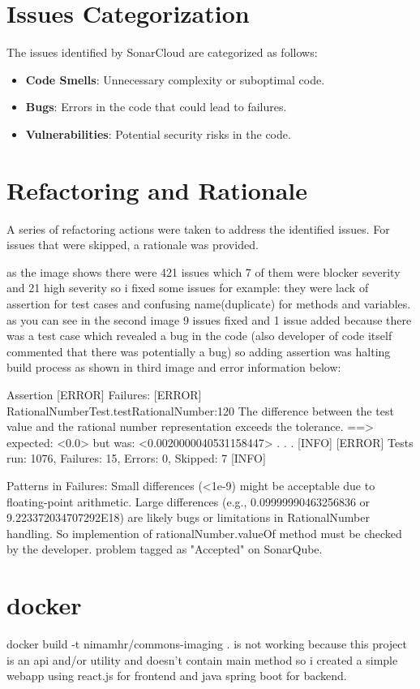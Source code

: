 \documentclass[a4paper,12pt]{report}
\begin{document}
\section{Issues Categorization}
The issues identified by SonarCloud are categorized as follows:
\begin{itemize}
    \item \textbf{Code Smells}: Unnecessary complexity or suboptimal code.
    \item \textbf{Bugs}: Errors in the code that could lead to failures.
    \item \textbf{Vulnerabilities}: Potential security risks in the code.
\end{itemize}

\section{Refactoring and Rationale}
A series of refactoring actions were taken to address the identified issues. For issues that were skipped, a rationale was provided. 

as the image shows there were 421 issues which 7 of them were blocker severity and 21 high severity so i fixed some issues for example:
they were lack of assertion for test cases and confusing name(duplicate) for methods and variables.
as you can see in the second image 9 issues fixed and 1 issue added because there was a test case which revealed a bug in the code (also developer of code itself commented that there was potentially a bug) so adding assertion was halting build process as shown in third image and error information below:


Assertion
[ERROR] Failures: 
[ERROR]   RationalNumberTest.testRationalNumber:120 The difference between the test value and the rational number representation exceeds the tolerance. ==> expected: <0.0> but was: <0.0020000040531158447>
.
.
.
[INFO] 
[ERROR] Tests run: 1076, Failures: 15, Errors: 0, Skipped: 7
[INFO] 

Patterns in Failures:
Small differences (<1e-9) might be acceptable due to floating-point arithmetic.
Large differences (e.g., 0.09999990463256836 or 9.223372034707292E18) are likely bugs or limitations in RationalNumber handling.
So implemention of rationalNumber.valueOf method must be checked by the developer. problem tagged as "Accepted" on SonarQube.


\section{docker}
 docker build -t nimamhr/commons-imaging .
 is not working because this project is an api and/or utility and doesn't contain main method so i created a simple webapp using react.js for frontend and java spring boot for backend.
\end{document}
